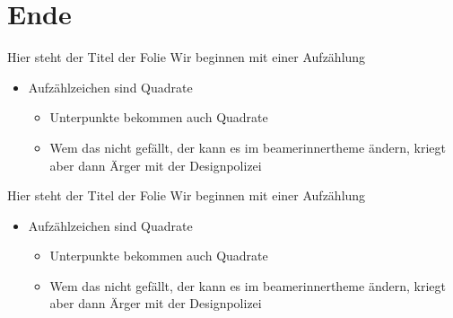 \documentclass[fleqn,10pt,t,tocinheader,widetoc]{beamer}
\begin{document}
\section{Ende}

\begin{frame}{Hier steht der Titel der Folie}
Wir beginnen mit einer Aufzählung
\begin{itemize}
\item Aufzählzeichen sind Quadrate
\begin{itemize}
\item Unterpunkte bekommen auch Quadrate
\item Wem das nicht gefällt, der kann es im beamerinnertheme ändern,
  kriegt aber dann Ärger mit der Designpolizei
\end{itemize}
\end{itemize}

\end{frame}

\begin{frame}{Hier steht der Titel der Folie}
Wir beginnen mit einer Aufzählung
\begin{itemize}
\item Aufzählzeichen sind Quadrate
\begin{itemize}
\item Unterpunkte bekommen auch Quadrate
\item Wem das nicht gefällt, der kann es im beamerinnertheme ändern,
  kriegt aber dann Ärger mit der Designpolizei
\end{itemize}
\end{itemize}

\end{frame}
\end{document}
